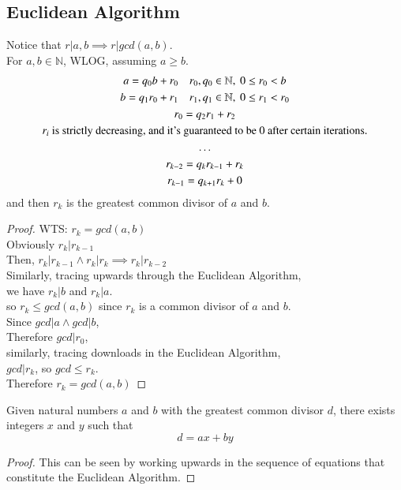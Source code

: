 \documentclass[10pt]{article}
\begin{document}
		\subsection{Euclidean Algorithm}
		\par Notice that $r | a, b \implies r | gcd(a, b)$. \\
		For $a, b \in \mathbb{N}$, WLOG, assuming $a \geq b$.
		\begin{gather*}
			a = q_0 b + r_0\quad r_0, q_0 \in \mathbb{N},\ 0 \leq r_0 < b \\
			b = q_1 r_0 + r_1\quad r_1, q_1 \in \mathbb{N},\ 0 \leq r_1 < r_0 \\
			r_0 = q_2 r_1 + r_2 \\
			r_i \text{{ is strictly decreasing, and it's guaranteed to be 0 after certain iterations.}} \\
			\dots \\
			r_{k-2} = q_{k} r_{k-1} + r_k \\ 
			r_{k-1} = q_{k+1} r_k + 0
		\end{gather*}
		and then $r_k$ is the greatest common divisor of $a$ and $b$.
		\begin{proof}
			WTS: $r_k = gcd(a, b)$ \\
			Obviously $r_k | r_{k-1}$ \\
			Then, $r_k | r_{k-1} \land r_k | r_k \implies r_k | r_{k-2}$ \\
			Similarly, tracing upwards through the Euclidean Algorithm, \\
			we have $r_k | b$ and $r_k | a$. \\
			so $r_k \leq gcd(a, b)$ since $r_k$ is a common divisor of $a$ and $b$. \\
			Since $gcd | a \land gcd | b$, \\
			Therefore $gcd | r_0$, \\
			similarly, tracing downloads in the Euclidean Algorithm, \\
			$gcd | r_k$, so $gcd \leq r_k$. \\
			Therefore $r_k = gcd(a, b)$
		\end{proof}
	
	\begin{theorem}
		Given natural numbers $a$ and $b$ with the greatest common divisor $d$, there exists integers $x$ and $y$ such that 
		\[
			d = ax + by
		\]
	\end{theorem}
	\begin{proof}
		This can be seen by working upwards in the sequence of equations that constitute the Euclidean Algorithm. 
	\end{proof}
		
\end{document}

